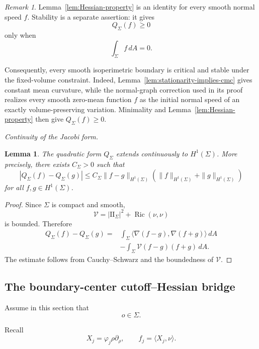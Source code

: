 \documentclass[11pt,reqno]{amsart}
\numberwithin{equation}{section}
\newtheorem{lemma}[theorem]{Lemma}
\theoremstyle{definition}
\theoremstyle{remark}
\newtheorem{remark}[theorem]{Remark}
\newcommand{\Ric}{\operatorname{Ric}}
\newcommand{\ithead}[1]{%
  \par\medskip\noindent\textit{#1}\enspace
}
\begin{document}
\begin{remark}
Lemma~\ref{lem:Hessian-property} is an identity for every smooth normal
speed \(f\). Stability is a separate assertion: it gives
\[
Q_\Sigma(f)\ge0
\]
only when
\[
\int_\Sigma f\,dA=0.
\]
\end{remark}
Consequently, every smooth isoperimetric boundary is critical and stable
under the fixed-volume constraint. Indeed,
Lemma~\ref{lem:stationarity-implies-cmc} gives constant mean curvature,
while the normal-graph correction used in its proof realizes every smooth
zero-mean function \(f\) as the initial normal speed of an exactly
volume-preserving variation. Minimality and
Lemma~\ref{lem:Hessian-property} then give \(Q_\Sigma(f)\ge0\).



\ithead{Continuity of the Jacobi form.}

\begin{lemma}
\label{lem:Q-continuity}
The quadratic form \(Q_\Sigma\) extends continuously to \(H^1(\Sigma)\).
More precisely, there exists \(C_\Sigma>0\) such that
\[
\left|
Q_\Sigma(f)-Q_\Sigma(g)
\right|
\le
C_\Sigma
\|f-g\|_{H^1(\Sigma)}
\left(
\|f\|_{H^1(\Sigma)}
+
\|g\|_{H^1(\Sigma)}
\right)
\]
for all \(f,g\in H^1(\Sigma)\).
\end{lemma}

\begin{proof}
Since \(\Sigma\) is compact and smooth,
\[
\mathcal V
=
|\mathrm{II}_\Sigma|^2+\Ric(\nu,\nu)
\]
is bounded. Therefore
\[
\begin{aligned}
Q_\Sigma(f)-Q_\Sigma(g)
={}&
\int_\Sigma
\langle\nabla(f-g),\nabla(f+g)\rangle\,dA
\\
&-
\int_\Sigma
\mathcal V(f-g)(f+g)\,dA.
\end{aligned}
\]
The estimate follows from Cauchy--Schwarz and the boundedness of
\(\mathcal V\).
\end{proof}

\subsection{The boundary-center cutoff--Hessian bridge}\label{sec:boundary-Hessian-bridge}

Assume in this section that
\[
o\in\Sigma.
\]

Recall
\[
X_j
=
\varphi_j\rho\partial_\rho,
\qquad
f_j
=
\langle X_j,\nu\rangle.
\]
\end{document}
